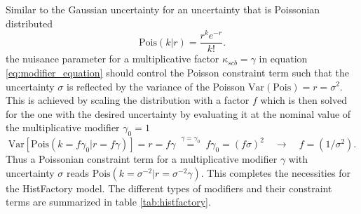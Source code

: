 Similar to the Gaussian uncertainty for an uncertainty that is Poissonian distributed
\begin{equation}
    \text{Pois}(k|r)= \frac{r^k e^{-r}}{k!}.
\end{equation}
the nuisance parameter for a multiplicative factor $\kappa_{scb}=\gamma$ in equation \ref{eq:modifier_equation} should control the Poisson constraint term such that the uncertainty $\sigma$ is reflected by the variance of the Poisson $\text{Var}(\text{Pois})=r=\sigma^2$. This is achieved by scaling the distribution with a factor $f$ which is then solved for the one with the desired uncertainty by evaluating it at the nominal value of the multiplicative modifier $\gamma_0=1$ 
\begin{equation}
    \mathrm{Var}\left[\mathrm{Pois}(k=f\gamma_0 | r=f\gamma)\right]
    =
    r=f\gamma\;\stackrel{\gamma=\gamma_0}{=}\;f\gamma_0=(f\sigma)^2 
    \quad 
    \rightarrow \quad f=(1/\sigma^2).
\end{equation}
Thus a Poissonian constraint term for a multiplicative modifier $\gamma$ with uncertainty $\sigma$ reads \mbox{$\text{Pois}(k=\sigma^{-2}|r=\sigma^{-2}\gamma)$.} This completes the necessities for the HistFactory model. The different types of modifiers and their constraint terms are summarized in table \ref{tab:histfactory}.
